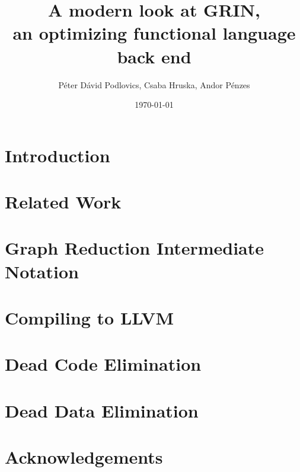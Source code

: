 \documentclass[10pt,a4paper,oneside]{article}
\title{\vspace{-2cm}A modern look at GRIN,\\ an optimizing functional language back end}
\date{\today}
\author{Péter Dávid Podlovics, Csaba Hruska, Andor Pénzes}
\begin{document}
	
	\maketitle
	
	
	\section{Introduction} \label{sec-intro}
	
	
	\section{Related Work}
	
	
	\section{Graph Reduction Intermediate Notation}
	
	
	\section{Compiling to LLVM}
	
	
	\section{Dead Code Elimination}
	
	
	\section{Dead Data Elimination}
	
	
	
	
	\section*{Acknowledgements}
	
	
	

	
\end{document}
